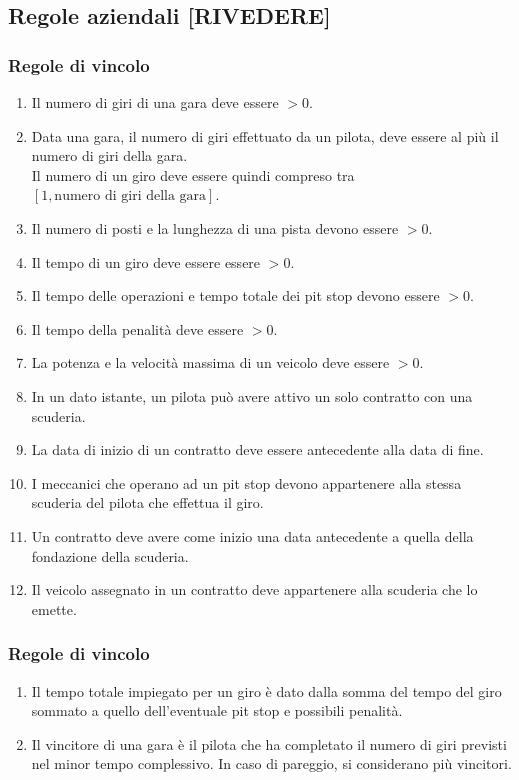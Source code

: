 \documentclass[11pt]{article}
\begin{document}
\subsection{Regole aziendali [RIVEDERE]}
\subsubsection{Regole di vincolo}
\begin{enumerate}[label={RV \arabic*}, leftmargin=4em]
    \item Il numero di giri di una gara deve essere $>0$.
    \item Data una gara, il numero di giri effettuato da un pilota, deve essere al più il numero di giri della gara.\\
          Il numero di un giro deve essere quindi compreso tra $[1, \text{numero di giri della gara}]$.
    \item Il numero di posti e la lunghezza di una pista devono essere $>0$. 
    \item Il tempo di un giro deve essere essere $>0$. 
    \item Il tempo delle operazioni e tempo totale dei pit stop devono essere $>0$.
    \item Il tempo della penalità deve essere $>0$.
    \item La potenza e la velocità massima di un veicolo deve essere $>0$.
    \item In un dato istante, un pilota può avere attivo un solo contratto con una scuderia.
    \item La data di inizio di un contratto deve essere antecedente alla data di fine.
    \item I meccanici che operano ad un pit stop devono appartenere alla stessa scuderia del pilota che effettua il giro.
    \item Un contratto deve avere come inizio una data antecedente a quella della fondazione della scuderia.
    \item Il veicolo assegnato in un contratto deve appartenere alla scuderia che lo emette.
\end{enumerate}

\subsubsection{Regole di vincolo}
\begin{enumerate}[label={RD \arabic*}, leftmargin=4em]
    \item Il tempo totale impiegato per un giro è dato dalla somma del tempo del giro sommato a quello dell'eventuale pit stop e possibili penalità.
    \item Il vincitore di una gara è il pilota che ha completato il numero di giri previsti nel minor tempo complessivo. In caso di pareggio, si considerano più vincitori.
\end{enumerate}
\end{document}
